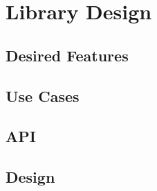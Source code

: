 \section{Library Design}

\subsection{Desired Features}

\subsection{Use Cases}

\subsection{API}

\subsection{Design}
\label{sec:vmmexplore-verdict}
